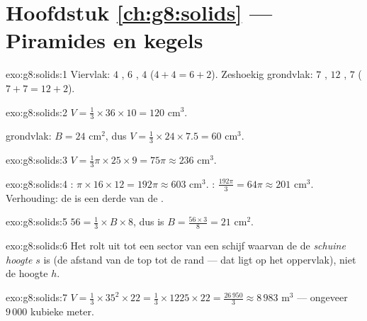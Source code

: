 \section*{Hoofdstuk \ref{ch:g8:solids} --- Piramides en kegels}

\begin{solution}{exo:g8:solids:1}
Viervlak: $4$ , $6$ , $4$  ($4 + 4 = 6 + 2$).
Zeshoekig grondvlak: $7$ , $12$ , $7$ 
($7 + 7 = 12 + 2$).
\end{solution}

\begin{solution}{exo:g8:solids:2}
$V = \frac13 \times 36 \times 10 = 120$ cm$^3$.

 grondvlak: $B = 24$ cm$^2$, dus
$V = \frac13 \times 24 \times 7.5 = 60$ cm$^3$.
\end{solution}

\begin{solution}{exo:g8:solids:3}
$V = \frac13 \pi \times 25 \times 9 = 75\pi \approx 236$ cm$^3$.
\end{solution}

\begin{solution}{exo:g8:solids:4}
: $\pi \times 16 \times 12 = 192\pi \approx 603$ cm$^3$. :
$\frac{192\pi}{3} = 64\pi \approx 201$ cm$^3$. Verhouding: de  is een derde
van de .
\end{solution}

\begin{solution}{exo:g8:solids:5}
$56 = \frac13 \times B \times 8$, dus is $B = \frac{56 \times 3}{8} = 21$
cm$^2$.
\end{solution}

\begin{solution}{exo:g8:solids:6}
Het  rolt uit tot een sector van een schijf waarvan de  de
\emph{schuine hoogte} $s$ is (de afstand van de top tot de rand --- dat 
ligt op het oppervlak), niet de hoogte $h$.
\end{solution}

\begin{solution}{exo:g8:solids:7}
$V = \frac13 \times 35^2 \times 22 = \frac13 \times 1225 \times 22
= \frac{26\,950}{3} \approx 8\,983$ m$^3$ --- ongeveer $9\,000$ kubieke meter.
\end{solution}

